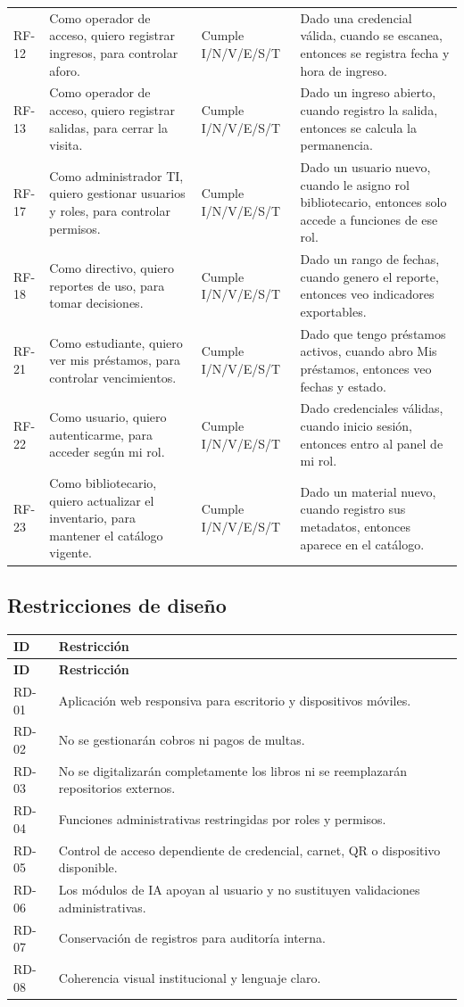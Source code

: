 \documentclass[12pt,journal,onecolumn]{IEEEtran}
\begin{document}
\begin{longtable}{P{0.09\textwidth}P{0.30\textwidth}P{0.18\textwidth}P{0.35\textwidth}}
RF-12 & Como operador de acceso, quiero registrar ingresos, para controlar aforo. & Cumple I/N/V/E/S/T & Dado una credencial válida, cuando se escanea, entonces se registra fecha y hora de ingreso.\\
RF-13 & Como operador de acceso, quiero registrar salidas, para cerrar la visita. & Cumple I/N/V/E/S/T & Dado un ingreso abierto, cuando registro la salida, entonces se calcula la permanencia.\\
RF-17 & Como administrador TI, quiero gestionar usuarios y roles, para controlar permisos. & Cumple I/N/V/E/S/T & Dado un usuario nuevo, cuando le asigno rol bibliotecario, entonces solo accede a funciones de ese rol.\\
RF-18 & Como directivo, quiero reportes de uso, para tomar decisiones. & Cumple I/N/V/E/S/T & Dado un rango de fechas, cuando genero el reporte, entonces veo indicadores exportables.\\
RF-21 & Como estudiante, quiero ver mis préstamos, para controlar vencimientos. & Cumple I/N/V/E/S/T & Dado que tengo préstamos activos, cuando abro Mis préstamos, entonces veo fechas y estado.\\
RF-22 & Como usuario, quiero autenticarme, para acceder según mi rol. & Cumple I/N/V/E/S/T & Dado credenciales válidas, cuando inicio sesión, entonces entro al panel de mi rol.\\
RF-23 & Como bibliotecario, quiero actualizar el inventario, para mantener el catálogo vigente. & Cumple I/N/V/E/S/T & Dado un material nuevo, cuando registro sus metadatos, entonces aparece en el catálogo.\\
\bottomrule
\end{longtable}

\subsection{Restricciones de diseño}
\begin{longtable}{P{0.12\textwidth}P{0.82\textwidth}}\toprule
\textbf{ID} & \textbf{Restricción}\\\midrule\endfirsthead
\toprule\textbf{ID} & \textbf{Restricción}\\\midrule\endhead
RD-01 & Aplicación web responsiva para escritorio y dispositivos móviles.\\
RD-02 & No se gestionarán cobros ni pagos de multas.\\
RD-03 & No se digitalizarán completamente los libros ni se reemplazarán repositorios externos.\\
RD-04 & Funciones administrativas restringidas por roles y permisos.\\
RD-05 & Control de acceso dependiente de credencial, carnet, QR o dispositivo disponible.\\
RD-06 & Los módulos de IA apoyan al usuario y no sustituyen validaciones administrativas.\\
RD-07 & Conservación de registros para auditoría interna.\\
RD-08 & Coherencia visual institucional y lenguaje claro.\\\bottomrule
\end{longtable}
\end{document}
